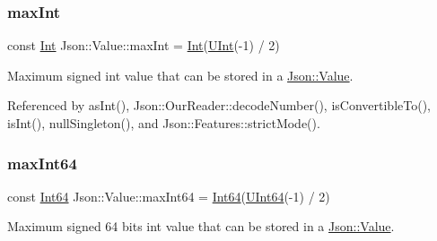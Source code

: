 \mbox{\label{classJson_1_1Value_a978c799a8af3114ef7dab6fd0a310a1b_a978c799a8af3114ef7dab6fd0a310a1b}} 
\subsubsection{\texorpdfstring{max\+Int}{maxInt}}
{\footnotesize\ttfamily const \hyperlink{classJson_1_1Value_abdf7a7ff73eb130ffcab28504ffdb405_abdf7a7ff73eb130ffcab28504ffdb405}{Int} Json\+::\+Value\+::max\+Int = \hyperlink{classJson_1_1Value_abdf7a7ff73eb130ffcab28504ffdb405_abdf7a7ff73eb130ffcab28504ffdb405}{Int}(\hyperlink{classJson_1_1Value_a0933d59b45793ae4aade1757c322a98d_a0933d59b45793ae4aade1757c322a98d}{U\+Int}(-\/1) / 2)\hspace{0.3cm}{\ttfamily [static]}}



Maximum signed int value that can be stored in a \hyperlink{classJson_1_1Value}{Json\+::\+Value}. 



Referenced by as\+Int(), Json\+::\+Our\+Reader\+::decode\+Number(), is\+Convertible\+To(), is\+Int(), null\+Singleton(), and Json\+::\+Features\+::strict\+Mode().

\mbox{\label{classJson_1_1Value_a4492634870b8c5709ce967b384ac6006_a4492634870b8c5709ce967b384ac6006}} 
\subsubsection{\texorpdfstring{max\+Int64}{maxInt64}}
{\footnotesize\ttfamily const \hyperlink{classJson_1_1Value_a1b86af9f85f0f1baa972c3319fa22695_a1b86af9f85f0f1baa972c3319fa22695}{Int64} Json\+::\+Value\+::max\+Int64 = \hyperlink{classJson_1_1Value_a1b86af9f85f0f1baa972c3319fa22695_a1b86af9f85f0f1baa972c3319fa22695}{Int64}(\hyperlink{classJson_1_1Value_a8b62564be8c087c6d18de180ff4e13e3_a8b62564be8c087c6d18de180ff4e13e3}{U\+Int64}(-\/1) / 2)\hspace{0.3cm}{\ttfamily [static]}}



Maximum signed 64 bits int value that can be stored in a \hyperlink{classJson_1_1Value}{Json\+::\+Value}. 




